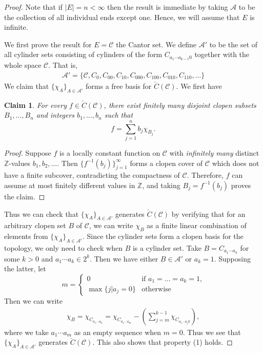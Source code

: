 \documentclass[11pt]{amsart}
\theoremstyle{plain}
\newtheorem*{CLAIME}{Claim}
\theoremstyle{definition}
\newcommand{\Z}{\mathbb{Z}}
\newcommand{\cC}{\mathcal{C}}
\newcommand{\cA}{\mathcal{A}}
\newcommand{\<}{\langle}
\renewcommand{\>}{\rangle}
\newcommand{\ceC}{\check{C}}
\begin{document}
\begin{proof}
    Note that if $|E| = n <\infty$ then the result is immediate by taking $\cA$ to be the collection of all individual ends except one. Hence, we will assume that $E$ is infinite. 

    We first prove the result for $E = \cC$ the Cantor set. We define $\cA'$ to be the set of all cylinder sets consisting of cylinders of the form $C_{a_{1}\cdots a_{k-1} 0}$ together with the whole space $\cC$. That is, 
    \begin{align*}
        \cA' = \{\cC,C_{0},C_{00},C_{10},C_{000},C_{100},C_{010},C_{110},\ldots \}
    \end{align*}
    We claim that $\{\chi_{A}\}_{A \in \cA'}$ forms a free basis for $\ceC(\cC)$. We first have

    \begin{CLAIME}
        For every $f \in \ceC(\cC)$, there exist finitely many disjoint clopen subsets $B_1,\ldots,B_n$ and integers $b_{1},\ldots, b_{n}$ such that
    \[
        f = \sum_{j=1}^n b_{j}\chi_{B_j}.
    \]
    \end{CLAIME}
    
\begin{proof}
        \renewcommand{\qedsymbol}{$\triangle$}
    Suppose $f$ is a locally constant function on $\cC$ with \emph{infinitely many} distinct $\Z$-values $b_1,b_2,\ldots$. Then $\{f^{-1}(b_j)\}_{j=1}^\infty$ forms a clopen cover of $\cC$ which does not have a finite subcover, contradicting the compactness of $\cC$. Therefore, $f$ can assume at most finitely different values in $\Z$, and taking $B_{j} = f^{-1}(b_{j})$ proves the claim.
\end{proof}

    Thus we can check that $\{\chi_{A}\}_{A \in \cA'}$ generates $\ceC(\cC)$ by verifying that for an arbitrary clopen set $B$ of $\mathcal{C}$, we can write $\chi_{B}$ as a finite linear combination of elements from $\{\chi_{A}\}_{A \in \cA'}$. Since the cylinder sets form a clopen basis for the topology, we only need to check when $B$ is a cylinder set. Take $B = C_{a_1\cdots a_k}$ for some $k > 0$ and $a_{1}\cdots a_{k} \in 2^{k}$. Then we have either $B \in \cA'$ or $a_{k} = 1$. Supposing the latter, let
    \[
        m = \begin{cases}
            0 & \text{if $a_1=\ldots=a_k=1$,}\\
            \max \{j\vert a_{j}=0\} & \text{otherwise}
        \end{cases}
    \]
    Then we can write 
    \begin{align*}
        \chi_B = \chi_{C_{a_{1}\cdots a_{k}}} = \chi_{C_{a_{1}\cdots a_{m}}} - \left(\sum_{j=m}^{k-1} \chi_{C_{a_{1}\cdots a_{j}0}} \right),
    \end{align*} 
    where we take $a_1\cdots a_m$ as an empty sequence when $m=0$.
    Thus we see that $\{\chi_{A}\}_{A \in \cA'}$ generates $\ceC(\cC)$. This also shows that property (1) holds.


\end{proof}
\end{document}
